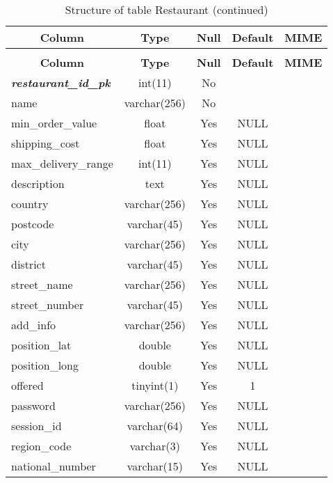 \documentclass[parskip=half, a4paper, DIV=14]{scrartcl}
\begin{document}
%
%
 \begin{longtable}{|l|c|c|c|l|} 
 \caption{Structure of table Restaurant} \label{tab:Restaurant-structure} \\
 \hline \multicolumn{1}{|c|}{\textbf{Column}} & \multicolumn{1}{|c|}{\textbf{Type}} & \multicolumn{1}{|c|}{\textbf{Null}} & \multicolumn{1}{|c|}{\textbf{Default}} & \multicolumn{1}{|c|}{\textbf{MIME}} \\ \hline \hline
\endfirsthead
 \caption{Structure of table Restaurant (continued)} \\ 
 \hline \multicolumn{1}{|c|}{\textbf{Column}} & \multicolumn{1}{|c|}{\textbf{Type}} & \multicolumn{1}{|c|}{\textbf{Null}} & \multicolumn{1}{|c|}{\textbf{Default}} & \multicolumn{1}{|c|}{\textbf{MIME}} \\ \hline \hline \endhead \endfoot 
\textbf{\textit{restaurant\_id\_pk}} & int(11) & No &  &  \\ \hline 
name & varchar(256) & No &  &  \\ \hline 
min\_order\_value & float & Yes & NULL &  \\ \hline 
shipping\_cost & float & Yes & NULL &  \\ \hline 
max\_delivery\_range & int(11) & Yes & NULL &  \\ \hline 
description & text & Yes & NULL &  \\ \hline 
country & varchar(256) & Yes & NULL &  \\ \hline 
postcode & varchar(45) & Yes & NULL &  \\ \hline 
city & varchar(256) & Yes & NULL &  \\ \hline 
district & varchar(45) & Yes & NULL &  \\ \hline 
street\_name & varchar(256) & Yes & NULL &  \\ \hline 
street\_number & varchar(45) & Yes & NULL &  \\ \hline 
add\_info & varchar(256) & Yes & NULL &  \\ \hline 
position\_lat & double & Yes & NULL &  \\ \hline 
position\_long & double & Yes & NULL &  \\ \hline 
offered & tinyint(1) & Yes & 1 &  \\ \hline 
password & varchar(256) & Yes & NULL &  \\ \hline 
session\_id & varchar(64) & Yes & NULL &  \\ \hline 
region\_code & varchar(3) & Yes & NULL &  \\ \hline 
national\_number & varchar(15) & Yes & NULL &  \\ \hline 
 \end{longtable}
\end{document}
